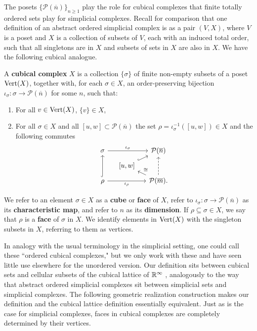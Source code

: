 The posets $\{\mathcal P(\overline n)\}_{n \geq 1}$ play the role for cubical complexes that finite totally ordered sets play for simplicial complexes.
Recall for comparison that one definition of an abstract ordered simplicial complex is as a pair $(V, X)$, where $V$ is a poset and $X$ is a collection of subsets of $V$, each with an induced total order, such that all singletons are in $X$ and subsets of sets in $X$ are also in $X$.
We have the following cubical analogue.	

\begin{definition}\label{D:cubical}
	A \textbf{cubical complex} $X$ is a collection $\{ \sigma \}$ of finite non-empty subsets of a poset 
	${\rm Vert}(X)$, together with, for each $\sigma \in X$, an order-preserving bijection $\iota_\sigma \colon \sigma \to \mathcal P(\overline n)$ for some $n$, such that:
	\begin{enumerate}
		\item For all $v \in {\rm Vert}(X)$, $\{v\} \in X$,
		\item For all $\sigma \in X$ and all $[u,w] \subset \mathcal P(\overline n)$ the set $\rho = \iota_\sigma^{-1}([u,w]) \in X$ and the following commutes
		\begin{equation*}
		\begin{tikzcd} [row sep = tiny, column sep= small]
		\sigma \arrow[rr, "\iota_\sigma"] && \mathcal P(\overline n) \\
		& [-5pt] {[}u,w{]} \arrow[ur, hook] & \\
		\rho \arrow[uu, hook] \arrow[rr, "\iota_\rho"'] && \mathcal P(\overline m). \arrow[ul, "\cong"'] \arrow[uu, dashed] 
		\end{tikzcd}
		\end{equation*}
	\end{enumerate}
	We refer to an element $\sigma \in X$ as a \textbf{cube} or \textbf{face} of $X$, refer to $\iota_\sigma \colon \sigma \to \mathcal P(\overline{n})$ as its \textbf{characteristic map}, 
	and refer to $n$ as its \textbf{dimension}. If $\rho \subseteq \sigma \in X$, we say that $\rho$ is a \textbf{face} of $\sigma$ in $X$. 
	We identify elements in ${\rm Vert}(X)$ with the singleton subsets in $X$, referring to them as vertices.
\end{definition}





In analogy with the usual terminology in the simplicial setting, one could call these ``ordered cubical complexes," but we only work with these and have seen little use elsewhere for the unordered version. 
Our definition sits between cubical sets \cite{jardine2002cubical} and cellular subsets of the cubical lattice of $\mathbb{R}^\infty$ \cite{kaczynski2006computational}, analogously to the way that abstract ordered simplicial complexes sit between simplicial sets and simplicial complexes.
The following geometric realization construction makes our definition and the cubical lattice definition essentially equivalent. Just as is the case for simplicial complexes, faces in cubical complexes are completely determined by their vertices.

